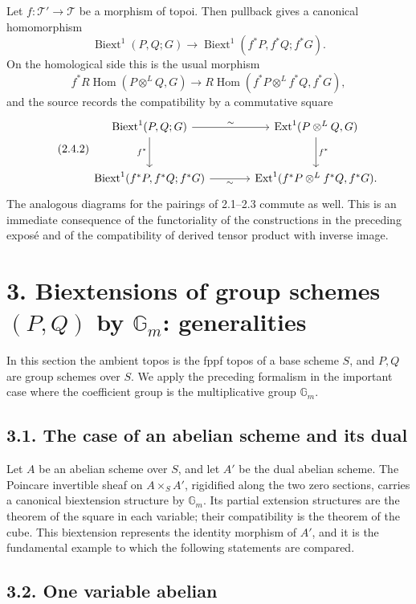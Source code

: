 \documentclass[11pt]{article}
\providecommand{\Gm}{\mathbb G_m}
\providecommand{\Hom}{\operatorname{Hom}}
\providecommand{\Ext}{\operatorname{Ext}}
\providecommand{\Biext}{\operatorname{Biext}}
\providecommand{\T}{\mathcal T}
\begin{document}
Let \(f:\T'\to\T\) be a morphism of topoi.  Then pullback gives a canonical homomorphism
\begin{equation}\tag{2.4.1}
        \Biext^1(P,Q;G)\longrightarrow
        \Biext^1(f^*P,f^*Q;f^*G).
\end{equation}
On the homological side this is the usual morphism
\[
        f^*R\!\Hom(P\otimes^LQ,G)\to
        R\!\Hom(f^*P\otimes^Lf^*Q,f^*G),
\]
and the source records the compatibility by a commutative square
\begin{equation}\tag{2.4.2}
\begin{tikzcd}[column sep=large,row sep=large]
\Biext^1(P,Q;G)\arrow[r,"\sim"]\arrow[d,"f^*"']&\Ext^1(P\otimes^LQ,G)\arrow[d,"f^*"]\\
\Biext^1(f^*P,f^*Q;f^*G)\arrow[r,"\sim"']&\Ext^1(f^*P\otimes^Lf^*Q,f^*G).
\end{tikzcd}
\end{equation}
The analogous diagrams for the pairings of 2.1--2.3 commute as well.  This is an immediate consequence of the functoriality of the constructions in the preceding exposé and of the compatibility of derived tensor product with inverse image.

\section*{3. Biextensions of group schemes \((P,Q)\) by \(\Gm\): generalities}

In this section the ambient topos is the fppf topos of a base scheme \(S\), and \(P,Q\) are group schemes over \(S\).  We apply the preceding formalism in the important case where the coefficient group is the multiplicative group \(\Gm\).

\subsection*{3.1. The case of an abelian scheme and its dual}

Let \(A\) be an abelian scheme over \(S\), and let \(A'\) be the dual abelian scheme.  The Poincare invertible sheaf on \(A\times_SA'\), rigidified along the two zero sections, carries a canonical biextension structure by \(\Gm\).  Its partial extension structures are the theorem of the square in each variable; their compatibility is the theorem of the cube.  This biextension represents the identity morphism of \(A'\), and it is the fundamental example to which the following statements are compared.

\subsection*{3.2. One variable abelian}
\end{document}
